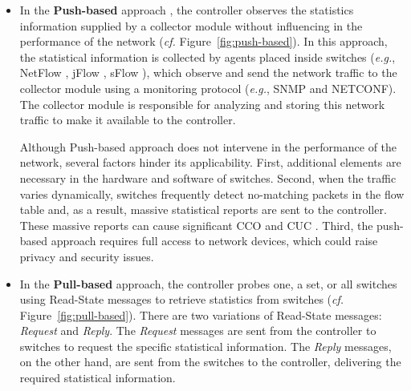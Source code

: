 \begin{itemize}
    \item In the \textbf{Push-based} approach \cite{claise2004:cisco_netflow,phaal2001:inmon_sflow}, the controller observes the statistics information supplied by a collector module without influencing in the performance of the network (\textit{cf.} Figure~\ref{fig:push-based}). In this approach, the statistical information is collected by agents placed inside switches (\textit{e.g.}, NetFlow \cite{claise_2004:cisco}, jFlow \cite{myers_1999:jflow}, sFlow \cite{wang_2004:sflow}), which observe and send the network traffic to the collector module using a monitoring protocol (\textit{e.g.}, SNMP and NETCONF). The collector module is responsible for analyzing and storing this network traffic to make it available to the controller.
    
    Although Push-based approach does not intervene in the performance of the network, several factors hinder its applicability. First, additional elements are necessary in the hardware and software of switches. Second, when the traffic varies dynamically, switches frequently detect no-matching packets in the flow table and, as a result, massive statistical reports are sent to the controller. These massive reports can cause significant CCO \cite{aslan_2016:impact} and CUC \cite{su_2014:flowcover}. Third, the push-based approach requires full access to network devices, which could raise privacy and security issues.
    
    \item In the \textbf{Pull-based} approach, the controller probes one, a set, or all switches using Read-State messages to retrieve statistics from switches (\textit{cf.} Figure~\ref{fig:pull-based}). There are two variations of Read-State messages: \textit{Request} and \textit{Reply}. The  \textit{Request} messages are sent from the controller to switches to request the specific statistical information. The \textit{Reply} messages, on the other hand, are sent from the switches to the controller, delivering the required statistical information.
    

\end{itemize}
